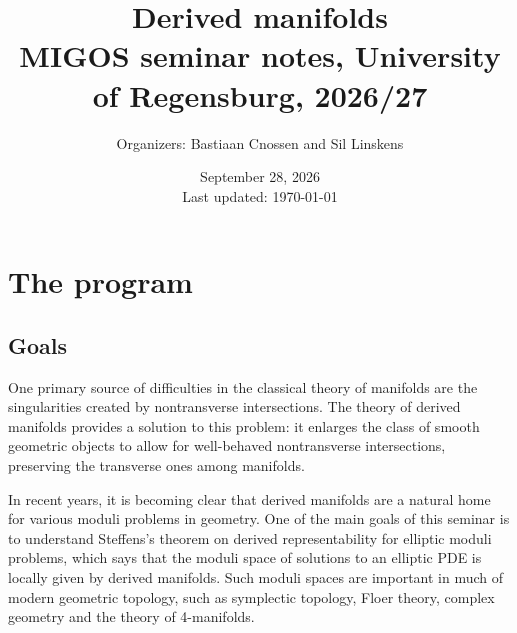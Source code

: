 \documentclass[11pt,a4paper]{book}
\begin{document}
\frontmatter

\title{Derived manifolds\\[10pt]
\Large MIGOS seminar notes, University of Regensburg, 2026/27}
\author{\large Organizers: Bastiaan Cnossen and Sil Linskens}
\date{September 28, 2026\\Last updated: \today}

\maketitle

\begin{KeepFromToc}
  \tableofcontents
\end{KeepFromToc}

\chapter*{The program}

\newcommand{\Talk}[6]{%
	\subsection*{Talk #1, #2: #3}
	\textbf{Aim.} #4
	
	\textbf{Content.} #5
	
	\textbf{Primary references.} #6
	\par\medskip
}

	
\section*{Goals}

One primary source of difficulties in the classical theory of manifolds are the singularities created by nontransverse intersections. The theory of derived manifolds provides a solution to this problem: it enlarges the class of smooth geometric objects to allow for well-behaved nontransverse intersections, preserving the transverse ones among manifolds.

In recent years, it is becoming clear that derived manifolds are a natural home for various moduli problems in geometry. One of the main goals of this seminar is to understand Steffens's theorem on derived representability for elliptic moduli problems, which says that the moduli space of solutions to an elliptic PDE is locally given by derived manifolds. Such moduli spaces are important in much of modern geometric topology, such as symplectic topology, Floer theory, complex geometry and the theory of 4-manifolds.
\end{document}
